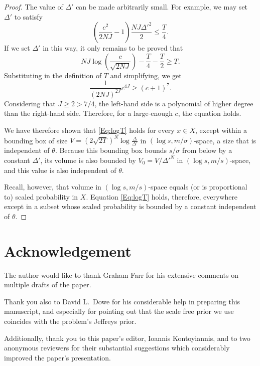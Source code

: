 \documentclass{IEEEtran}
\begin{document}
\begin{proof}
The value of $\Delta'$ can be made arbitrarily small. For example, we
may set $\Delta'$ to satisfy
\[
\left(\frac{c^2}{2 N J}-1\right) \frac{NJ\Delta'^2}{2} \le \frac{T}{4}.
\]
If we set $\Delta'$ in this way, it only remains to be proved that
\[
NJ\log\left(\frac{c}{\sqrt{2 N J}}\right)-\frac{T}{4}-\frac{T}{2}\ge T.
\]
Substituting in the definition of $T$ and simplifying, we get
\[
\frac{1}{(2 N J)^{2J}} c^{4J} \ge (c+1)^7.
\]
Considering that $J\ge 2> 7/4$, the left-hand side is a polynomial of higher
degree than the right-hand side. Therefore, for a large-enough $c$, the
equation holds.

We have therefore shown that \eqref{Eq:logT} holds for every $x\in X$, except
within a bounding box of size
$V=\left(2\sqrt{2T}\right)^N \log \frac{\Delta}{\Delta'}$
in $(\log s,m/\sigma)$-space, a size that is independent of $\theta$.
Because this bounding box bounds $s/\sigma$ from
below by a constant $\Delta'$, its volume is also bounded by
$V_0=V/\Delta'^N$ in $(\log s,m/s)$-space,
and this value is also independent of $\theta$.

Recall, however, that volume in $(\log s,m/s)$-space equals
(or is proportional to)
scaled probability in $X$. Equation \eqref{Eq:logT} holds, therefore,
everywhere except in a subset whose scaled probability is bounded by a constant
independent of $\theta$.
\end{proof}

\section*{Acknowledgement}
The author would like to thank Graham Farr for his extensive comments
on multiple drafts of the paper.

Thank you also to David L.\ Dowe for his considerable help in
preparing this manuscript, and especially for pointing out that the
scale free prior we use coincides with the problem's
Jeffreys prior.

Additionally, thank you to this paper's editor, Ioannis Kontoyiannis, and
to two anonymous reviewers for their substantial suggestions which
considerably improved the paper's presentation.



\end{document}
